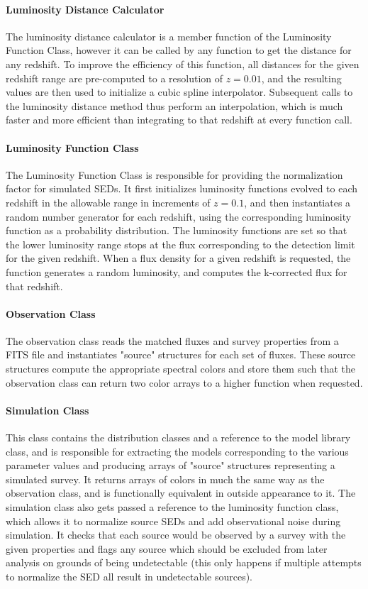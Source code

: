 \documentclass[twocolumn,letterpaper,10pt]{article}
\begin{document}
\paragraph{Luminosity Distance Calculator}
The luminosity distance calculator is a member function of the Luminosity Function Class, however it can be called by any function to get the distance for any redshift. To improve the efficiency of this function, all distances for the given redshift range are pre-computed to a resolution of $z=0.01$, and the resulting values are then used to initialize a cubic spline interpolator. Subsequent calls to the luminosity distance method thus perform an interpolation, which is much faster and more efficient than integrating to that redshift at every function call.

\paragraph{Luminosity Function Class}
The Luminosity Function Class is responsible for providing the normalization factor for simulated SEDs. It first initializes luminosity functions evolved to each redshift in the allowable range in increments of $z=0.1$, and then instantiates a random number generator for each redshift, using the corresponding luminosity function as a probability distribution. The luminosity functions are set so that the lower luminosity range stops at the flux corresponding to the detection limit for the given redshift. When a flux density for a given redshift is requested, the function generates a random luminosity, and computes the k-corrected flux for that redshift.

\paragraph{Observation Class}
The observation class reads the matched fluxes and survey properties from a FITS file and instantiates "source" structures for each set of fluxes. These source structures compute the appropriate spectral colors and store them such that the observation class can return two color arrays to a higher function when requested.

\paragraph{Simulation Class}
This class contains the distribution classes and a reference to the model library class, and is responsible for extracting the models corresponding to the various parameter values and producing arrays of "source" structures representing a simulated survey. It returns arrays of colors in much the same way as the observation class, and is functionally equivalent in outside appearance to it. The simulation class also gets passed a reference to the luminosity function class, which allows it to normalize source SEDs and add observational noise during simulation. It checks that each source would be observed by a survey with the given properties and flags any source which should be excluded from later analysis on grounds of being undetectable (this only happens if multiple attempts to normalize the SED all result in undetectable sources).
\end{document}
